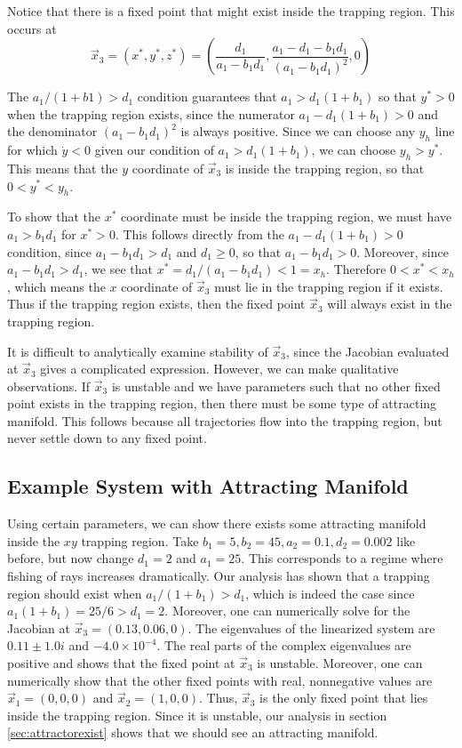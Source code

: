\documentclass[%
        final,
        notitlepage,
        narroweqnarray,
        inline,
        ]{ieee}
\begin{document}
Notice that there is a fixed point that might exist inside the trapping region. This occurs at 
\begin{equation}
\vec{x}_3 = (x^{*},y^{*},z^{*}) = \left( \frac{d_1}{a_1 - b_1 d_1}, \frac{a_1 - d_1 - b_1 d_1}{(a_1 - b_1 d_1)^2}, 0 \right)
\end{equation}

The $a_1 / (1 + b1) > d_1$ condition guarantees that $a_1 > d_1 (1 + b_1)$ so that $y^{*} > 0$ when the trapping region exists, since the numerator $a_1 - d_1(1 + b_1) >0$ and the denominator $(a_1 - b_1 d_1)^2$ is always positive. Since we can choose any $y_h$ line for which $\dot{y} < 0$ given our condition of $a_1 > d_1 ( 1 + b_1)$, we can choose $y_h > y^{*}$. This means that the $y$ coordinate of $\vec{x}_3$ is inside the trapping region, so that $0 < y^{*} < y_h$.

To show that the $x^{*}$ coordinate must be inside the trapping region, we must have $a_1 > b_1 d_1$ for $x^{*} > 0$. This follows directly from the $a_1 - d_1(1 + b_1) > 0$ condition, since $a_1 - b_1 d_1 > d_1$ and $d_1 \geq 0$, so that $a_1 - b_1 d_1 > 0$. Moreover, since $a_1 - b_1 d_1 > d_1$, we see that $x^{*} = d_1 / (a_1 - b_1 d_1) < 1 = x_h$. Therefore $0 < x^{*} < x_h$, which means the $x$ coordinate of $\vec{x}_3$ must lie in the trapping region if it exists. Thus if the trapping region exists, then the fixed point $\vec{x}_3$ will always exist in the trapping region. 

It is difficult to analytically examine stability of $\vec{x}_3$, since the Jacobian evaluated at $\vec{x}_3$ gives a complicated expression. However, we can make qualitative observations. If $\vec{x}_3$ is unstable and we have parameters such that no other fixed point exists in the trapping region, then there must be some type of attracting manifold. This follows because all trajectories flow into the trapping region, but never settle down to any fixed point. 

\subsection{Example System with Attracting Manifold}

Using certain parameters, we can show there exists some attracting manifold inside the $xy$ trapping region. Take $b_1 = 5, b_2 = 45, a_2 = 0.1, d_2 = 0.002$ like before, but now change $d_1 = 2$ and $a_1 = 25$. This corresponds to a regime where fishing of rays increases dramatically. Our analysis has shown that a trapping region should exist when $a_1 / (1 + b_1) > d_1$, which is indeed the case since $a_1 ( 1 + b_1) = 25 / 6 > d_1 = 2$. Moreover, one can numerically solve for the Jacobian at $\vec{x}_3 = (0.13, 0.06, 0)$. The eigenvalues of the linearized system are $0.11 \pm 1.0i$ and $-4.0 \times 10^{-4}$. The real parts of the complex eigenvalues are positive and shows that the fixed point at $\vec{x}_3$ is unstable. Moreover, one can numerically show that the other fixed points with real, nonnegative values are $\vec{x}_1 = (0,0,0)$ and  $\vec{x}_2 = (1,0,0)$. Thus, $\vec{x}_3$ is the only fixed point that lies inside the trapping region. Since it is unstable, our analysis in section \ref{sec:attractorexist} shows that we should see an attracting manifold.
\end{document}
